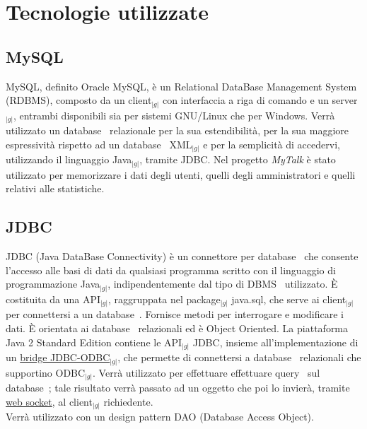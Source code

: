 \section{Tecnologie utilizzate} {
	
	\subsection{MySQL}{
		MySQL, definito Oracle MySQL, è un Relational DataBase Management System (RDBMS), composto da un client$_{|g|}$ 
		con interfaccia a riga di comando e un server$_{|g|}$, entrambi disponibili sia per sistemi GNU/Linux che per Windows. 
		Verrà utilizzato un database\g~ 
		relazionale per la sua estendibilità, per la sua maggiore espressività rispetto ad un database\g~ XML$_{|g|}$ e per 
		la semplicità di accedervi, utilizzando il linguaggio Java$_{|g|}$, tramite JDBC.
		Nel progetto \textit{MyTalk} è stato utilizzato per memorizzare i dati degli utenti, quelli degli amministratori 
		e quelli relativi alle statistiche.
	}

	\subsection{JDBC}{
		JDBC (Java DataBase Connectivity) è un connettore per database\g~ che consente l'accesso alle basi di dati da qualsiasi 
		programma scritto con il linguaggio di programmazione Java$_{|g|}$, indipendentemente dal tipo di DBMS\g~ utilizzato. 
		È costituita da una API$_{|g|}$, raggruppata nel package$_{|g|}$ java.sql, che serve ai client$_{|g|}$ per connettersi 
		a un database\g~. Fornisce metodi per interrogare e modificare i dati. È orientata ai database\g~ relazionali ed è Object 
		Oriented. La piattaforma Java 2 Standard Edition contiene le API$_{|g|}$ JDBC, insieme all'implementazione di un 
		\underline{bridge JDBC-ODBC}$_{|g|}$, che permette di connettersi a database\g~ relazionali che supportino ODBC$_{|g|}$.
		Verrà utilizzato per effettuare effettuare query\g~ sul database\g~; tale risultato verrà passato ad un oggetto che poi 
		lo invierà, tramite \underline{web socket}, al client$_{|g|}$ richiedente.\\
		Verrà utilizzato con un design pattern DAO (Database Access Object).
	}

}
